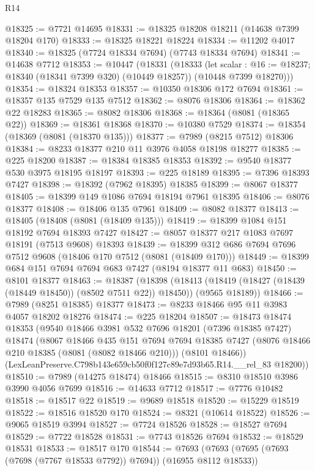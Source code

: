 \begin{lexlean}{R14}
\begin{coremodule}
@18325 := @7721 @14695
@18331 := @18325 @18208 @18211 (@14638 @7399 @18204 @170)
@18333 := @18325 @18221 @18224
@18334 := @11202 @4017
@18340 := @18325 (@7724 @18334 @7694) (@7743 @18334 @7694)
@18341 := @14638 @7712
@18353 := @10447
    (@18331
      (@18333
        (let scalar : @16 := @18237; @18340 (@18341 @7399 @320) (@10449 @18257))
        (@10448 @7399 @18270)))
@18354 := @18324 @18353
@18357 := @10350 @18306 @172 @7694
@18361 := @18357 @135 @7529 @135 @7512
@18362 := @8076 @18306
@18364 := @18362 @22 @18283
@18365 := @8082 @18306
@18368 := @18364 (@8081 (@18365 @22))
@18369 := @18361 @18368
@18370 := @10380 @7529
@18374 := @18354 (@18369 (@8081 (@18370 @135)))
@18377 := @7989 (@8215 @7512) @18306
@18384 := @8233 @18377 @210 @11 @3976 @4058 @18198 @18277
@18385 := @225 @18200
@18387 := @18384 @18385 @18353
@18392 := @9540 @18377 @530 @3975 @18195 @18197
@18393 := @225 @18189
@18395 := @7396 @18393 @7427
@18398 := @18392 (@7962 @18395) @18385
@18399 := @8067 @18377
@18405 := @18399 @149 @1086 @7694 @18194 @7961 @18395
@18406 := @8076 @18377
@18408 := @18406 @135 @7961
@18409 := @8082 @18377
@18413 := @18405 (@18408 (@8081 (@18409 @135)))
@18419 := @18399 @1084 @151 @18192 @7694 @18393 @7427
@18427 := @8057 @18377 @217 @1083 @7697 @18191 (@7513 @9608) @18393
@18439 := @18399 @312 @686 @7694 @7696 @7512 @9608 (@18406 @170 @7512 (@8081 (@18409 @170)))
@18449 := @18399 @684 @151 @7694 @7694 @683 @7427 (@8194 @18377 @11 @683)
@18450 := @8101 @18377
@18463 := @18387
    (@18398
      (@18413 (@18419 (@18427 (@18439 (@18449 @18450)) (@8502 @7511 @22)) @18450))
      (@9565 @18189))
@18466 := @7989 (@8251 @18385) @18377
@18473 := @8233 @18466 @95 @11 @3983 @4057 @18202 @18276
@18474 := @225 @18204
@18507 := @18473
    @18474
    @18353
    (@9540
      @18466
      @3981
      @532
      @7696
      @18201
      (@7396 @18385 @7427)
      @18474
      (@8067
        @18466
        @435
        @151
        @7694
        @7694
        @18385
        @7427
        (@8076 @18466 @210 @18385 (@8081 (@8082 @18466 @210)))
        (@8101 @18466))
      (LexLeanPreserve.C798b143e659cb50f0f127c89e7d93b65.R14.__rel_83 @18200))
@18510 := @7989 (@14275 @18474) @18466
@18515 := @8310 @18510 @3986 @3990 @4056 @7699
@18516 := @14633 @7712
@18517 := @7776 @10482
@18518 := @18517 @22
@18519 := @9689 @18518
@18520 := @15229 @18519
@18522 := @18516 @18520 @170
@18524 := @8321 (@10614 @18522)
@18526 := @9065 @18519 @3994
@18527 := @7724 @18526
@18528 := @18527 @7694
@18529 := @7722 @18528
@18531 := @7743 @18526 @7694
@18532 := @18529 @18531
@18533 := @18517 @170
@18544 := @7693 (@7693 (@7695 (@7693 (@7698 (@7767 @18533 @7792)) @7694)) (@16955 @8112 @18533))

\end{coremodule}
\end{lexlean}
